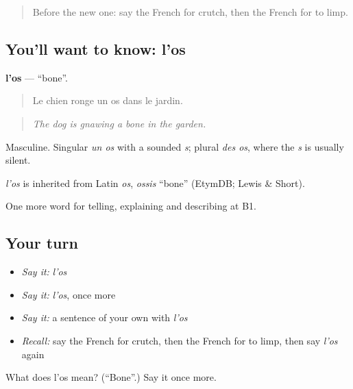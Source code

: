 \label{lesson:FR-C480-os}



\begin{quote}
Before the new one: say the French for crutch, then the French for to limp.
\end{quote}

\subsection*{You'll want to know: l'os}
\textbf{l'os} — \textquotedblleft{}bone\textquotedblright{}.

\begin{quote}
Le chien ronge un os dans le jardin.
\end{quote}

\begin{quote}
\emph{The dog is gnawing a bone in the garden.}
\end{quote}

Masculine. Singular \emph{un os} with a sounded \emph{s}; plural \emph{des os}, where the \emph{s} is usually silent.

\begin{cousinweb}
\emph{l'os} is inherited from Latin \emph{os}, \emph{ossis} \textquotedblleft{}bone\textquotedblright{} (EtymDB; Lewis \& Short).
\end{cousinweb}

\begin{grammarlens}[title={What you've built}]
One more word for telling, explaining and describing at B1.
\end{grammarlens}

\subsection*{Your turn}
\begin{itemize}
\raggedright
  \item \emph{Say it:} \emph{l'os}
  \item \emph{Say it:} \emph{l'os}, once more
  \item \emph{Say it:} a sentence of your own with \emph{l'os}
  \item \emph{Recall:} say the French for crutch, then the French for to limp, then say \emph{l'os} again
\end{itemize}

\begin{tcolorbox}[breakable,colback=teal!4,colframe=teal!35!black,title={Before you move on}]
What does l'os mean? (\textquotedblleft{}Bone\textquotedblright{}.) Say it once more.
\end{tcolorbox}
